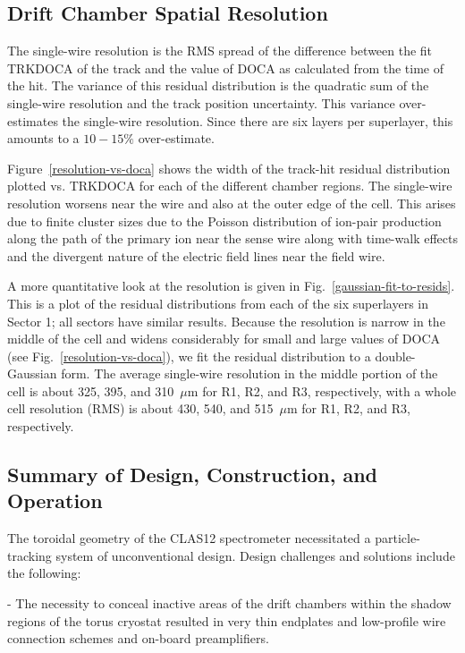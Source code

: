 \subsection{Drift Chamber Spatial Resolution}

The single-wire resolution is the RMS spread of the difference 
between the fit TRKDOCA of the track and the value of DOCA as calculated from the 
time of the hit.  The variance of this residual distribution 
is the quadratic sum of the single-wire resolution and the track position uncertainty.  
This variance over-estimates the single-wire resolution.
Since there are six layers per superlayer,
this amounts to a $10 - 15\%$ over-estimate.

Figure~\ref{resolution-vs-doca} shows the width of the track-hit residual distribution plotted vs.
TRKDOCA for each of the different chamber regions.  The single-wire resolution worsens near the 
wire and also at the outer edge of the cell.  This arises due to finite cluster sizes 
due to the Poisson distribution of ion-pair production along the path of the primary ion 
near the sense wire along with time-walk effects and the divergent nature of the electric
field lines near the field wire.  

A more quantitative look at the resolution is given in Fig.~\ref{gaussian-fit-to-resids}.
This is a plot of the residual distributions from each of the six superlayers in Sector 1; 
all sectors have similar results.
Because the resolution is narrow in the middle of the cell and widens considerably
for small and large values of DOCA (see Fig.~\ref{resolution-vs-doca}), we fit the
residual distribution to a double-Gaussian form. 
The average single-wire resolution in the middle 
portion of the cell is about 325, 395, and 310~$\mu$m for R1, R2, and R3, respectively,
with a whole cell resolution (RMS) is about 430, 540, and 515~$\mu$m for R1, R2, and R3, respectively.

\subsection{Summary of Design, Construction, and Operation}

The toroidal geometry of the CLAS12 spectrometer necessitated a particle-tracking 
system of unconventional design.  Design challenges and solutions include the following:

\noindent
- The necessity to conceal inactive areas of the drift chambers within the
shadow regions of the torus cryostat resulted in very thin endplates and low-profile
wire connection schemes and on-board preamplifiers.

